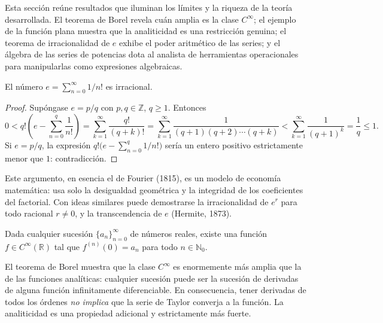Esta sección reúne resultados que iluminan los límites y la riqueza
de la teoría desarrollada. El teorema de Borel revela cuán amplia es
la clase $C^\infty$; el ejemplo de la función plana muestra que la
analiticidad es una restricción genuina; el teorema de irracionalidad
de $e$ exhibe el poder aritmético de las series; y el álgebra de las
series de potencias dota al analista de herramientas operacionales
para manipularlas como expresiones algebraicas.

\begin{theorem}[Irracionalidad de $e$]
\label{thm:irrac_e}
El número $e = \sum_{n=0}^\infty 1/n!$ es irracional.
\end{theorem}

\begin{proof}
Supóngase $e = p/q$ con $p,q \in \mathbb{Z}$, $q \geq 1$. Entonces
\[
    0 < q!\left(e - \sum_{n=0}^q \frac{1}{n!}\right)
    = \sum_{k=1}^\infty \frac{q!}{(q+k)!}
    = \sum_{k=1}^\infty \frac{1}{(q+1)(q+2)\cdots(q+k)}
    < \sum_{k=1}^\infty \frac{1}{(q+1)^k} = \frac{1}{q} \leq 1.
\]
Si $e = p/q$, la expresión $q!\bigl(e - \sum_{n=0}^q 1/n!\bigr)$
sería un entero positivo estrictamente menor que $1$: contradicción.
\end{proof}

\begin{rem}
Este argumento, en esencia el de Fourier (1815), es un modelo de
economía matemática: usa solo la desigualdad geométrica y la
integridad de los coeficientes del factorial. Con ideas similares
puede demostrarse la irracionalidad de $e^r$ para todo racional
$r\neq 0$, y la transcendencia de $e$ (Hermite, 1873).
\end{rem}

\begin{theorem}
\label{thm:borel}
Dada cualquier sucesión $\{a_n\}_{n=0}^\infty$ de números reales,
existe una función $f \in C^\infty(\mathbb{R})$ tal que
$f^{(n)}(0) = a_n$ para todo $n \in \mathbb{N}_0$.
\end{theorem}

\begin{rem}
El teorema de Borel muestra que la clase $C^\infty$ es enormemente más
amplia que la de las funciones analíticas: cualquier sucesión puede
ser la sucesión de derivadas de alguna función infinitamente
diferenciable. En consecuencia, tener derivadas de todos los órdenes
\emph{no implica} que la serie de Taylor converja a la función. La
analiticidad es una propiedad adicional y estrictamente más fuerte.
\end{rem}

